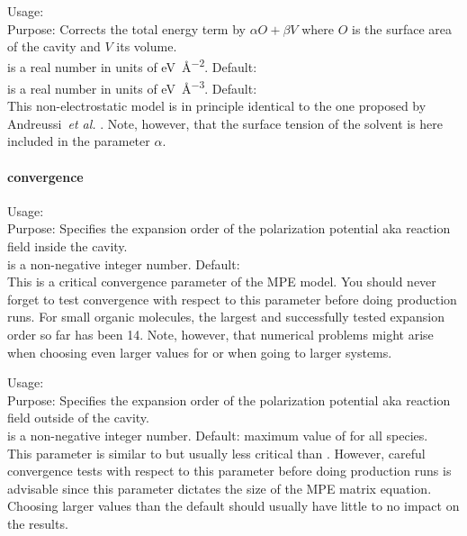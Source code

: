 {
  \noindent
  Usage:  
    \option{$\alpha$} \option{$\beta$} \\[1.0ex] 
  Purpose: Corrects the total energy term by $\alpha O + \beta V$ 
    where $O$ is the surface area of the cavity and
    $V$ its volume. \\[1.0ex]
  \option{$\alpha$} is a real number in units of 
    \si{\electronvolt\per\angstrom\squared}. 
    Default:  \\
  \option{$\beta$} is a real number in units of 
    \si{\electronvolt\per\cubic\angstrom}. 
    Default:  \\
}
This non-electrostatic model is in principle identical to the one 
proposed by Andreussi~\emph{et al.} \cite{Andreussi2012}. 
Note, however, that the surface tension of the solvent is here 
included in the parameter $\alpha$. 


\paragraph{convergence}

{
  \noindent
  Usage:   \\[1.0ex] 
  Purpose: Specifies the expansion order of the 
    polarization potential aka reaction field 
    inside the cavity. \\[1.0ex]
   is a non-negative integer number. 
    Default:  \\
}
This is a critical convergence parameter of 
the MPE model. You should never forget to test 
convergence with respect to this parameter before 
doing production runs. 
For small organic molecules, the largest and 
successfully tested expansion order so far has been 14. 
Note, however, that numerical problems might arise when 
choosing even larger values for  or 
when going to larger systems. 

{
  \noindent
  Usage:   \\[1.0ex] 
  Purpose: Specifies the expansion order of the 
    polarization potential aka reaction field 
    outside of the cavity. \\[1.0ex]
   is a non-negative integer number. 
    Default: maximum value of 
       for all
      species. \\
}
This parameter is similar to but usually less critical 
than . However, careful convergence 
tests with respect to this parameter before 
doing production runs is advisable since this parameter 
dictates the size of the MPE matrix equation. 
Choosing larger values than the default should 
usually have little to no impact on the results. 


